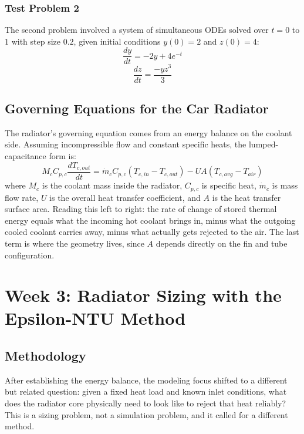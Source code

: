 \documentclass[12pt, a4paper]{article}
\begin{document}
\subsubsection{Test Problem 2}
The second problem involved a system of simultaneous ODEs solved over $t = 0$ to $1$ with step size $0.2$, given initial conditions $y(0) = 2$ and $z(0) = 4$:
\begin{equation}
    \frac{dy}{dt} = -2y + 4e^{-t}
\end{equation}
\begin{equation}
    \frac{dz}{dt} = \frac{-yz^3}{3}
\end{equation}

\subsection{Governing Equations for the Car Radiator}
The radiator's governing equation comes from an energy balance on the coolant side. Assuming incompressible flow and constant specific heats, the lumped-capacitance form is:
\begin{equation}
    M_c C_{p,c} \frac{dT_{c,out}}{dt} = \dot{m}_c C_{p,c} (T_{c,in} - T_{c,out}) - U A (T_{c,avg} - T_{air})
\end{equation}
where $M_c$ is the coolant mass inside the radiator, $C_{p,c}$ is specific heat, $\dot{m}_c$ is mass flow rate, $U$ is the overall heat transfer coefficient, and $A$ is the heat transfer surface area. Reading this left to right: the rate of change of stored thermal energy equals what the incoming hot coolant brings in, minus what the outgoing cooled coolant carries away, minus what actually gets rejected to the air. The last term is where the geometry lives, since $A$ depends directly on the fin and tube configuration.

\section{Week 3: Radiator Sizing with the Epsilon-NTU Method}

\subsection{Methodology}
After establishing the energy balance, the modeling focus shifted to a different but related question: given a fixed heat load and known inlet conditions, what does the radiator core physically need to look like to reject that heat reliably? This is a sizing problem, not a simulation problem, and it called for a different method.
\end{document}
